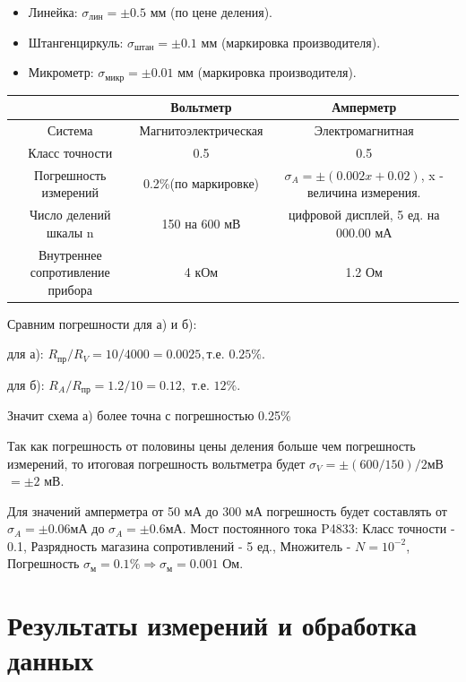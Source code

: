 \documentclass[a4paper]{article}
\begin{document}
\begin{itemize}
  \item Линейка:  $\sigma_\text{лин} = \pm 0.5$ мм (по цене деления).
  \item Штангенциркуль: $\sigma_\text{штан} = \pm0.1$ мм (маркировка производителя).
  \item Микрометр:  $\sigma_\text{микр} = \pm0.01$ мм (маркировка производителя).
\end{itemize}  
\begin{center}
    \begin{tabular}{|c | c | c |}
     \hline
      & Вольтметр & Амперметр \\
    \hline
     Система & Магнитоэлектрическая & Электромагнитная \\ 
     \hline
     Класс точности & 0.5 & 0.5 \\
     \hline
    Погрешность измерений & 0.2\%(по маркировке) &$\sigma_{A} = \pm(0.002x+0.02)$, x - величина измерения.\\
     \hline
     Число делений шкалы n & 150 на 600 мВ & цифровой дисплей, 5 ед. на 000.00 мА \\
     \hline
     Внутреннее сопротивление прибора & 4 кОм & 1.2 Ом \\
     \hline
    \end{tabular} 
\end{center}
Сравним погрешности для а) и б):\par
    для а): $R_\text{пр}/R_{V} = 10/4000 = 0.0025 ,  \text{т.е. } 0.25\%$.\par
    для б): $R_{A}/R_\text{пр} = 1.2/10 = 0.12,$ т.е. $12\%$.\par
    Значит схема а) более точна с погрешностью 0.25\% \par
    Так как погрешность от половины цены деления больше чем погрешность измерений, то итоговая погрешность вольтметра будет $\sigma_{V} = \pm(600/150)/2 $мВ$= \pm 2$ мВ.\par
    Для значений амперметра от 50 мА до 300 мА погрешность будет составлять от $\sigma_{A} = \pm 0.06 \text{мА}$ до  $\sigma_{A} = \pm 0.6 \text{мА}$.
Мост постоянного тока P4833: Класс точности - 0.1, Разрядность магазина сопротивлений - 5 ед., Множитель - $N = 10^{-2}$, Погрешность $\sigma_\text{м} = 0.1\% \Rightarrow  \sigma_\text{м} = 0.001$ Ом.


\section{Результаты измерений и обработка данных}
\end{document}
